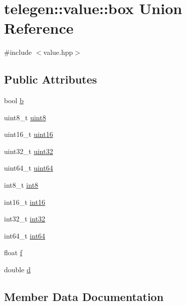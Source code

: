 \hypertarget{uniontelegen_1_1value_1_1box}{}\section{telegen\+:\+:value\+:\+:box Union Reference}
\label{uniontelegen_1_1value_1_1box}


{\ttfamily \#include $<$value.\+hpp$>$}

\subsection*{Public Attributes}
\begin{DoxyCompactItemize}
\item 
bool \hyperlink{uniontelegen_1_1value_1_1box_aca1e8ed6a879c47f23ea0d0d562cff56}{b}
\item 
uint8\+\_\+t \hyperlink{uniontelegen_1_1value_1_1box_af93ba02e91378fcc5dfd7dd44797d9f1}{uint8}
\item 
uint16\+\_\+t \hyperlink{uniontelegen_1_1value_1_1box_ac35300dde1553e491b47b7beb6da05fd}{uint16}
\item 
uint32\+\_\+t \hyperlink{uniontelegen_1_1value_1_1box_a4d9a4908f9344f86f83b562b1dfd5b41}{uint32}
\item 
uint64\+\_\+t \hyperlink{uniontelegen_1_1value_1_1box_af779cb73fc8206ea9e492ca721693519}{uint64}
\item 
int8\+\_\+t \hyperlink{uniontelegen_1_1value_1_1box_ad0228111650848fbc6aa00ab703d4da8}{int8}
\item 
int16\+\_\+t \hyperlink{uniontelegen_1_1value_1_1box_ab5661f0b60552b18a622da1c5795eb8a}{int16}
\item 
int32\+\_\+t \hyperlink{uniontelegen_1_1value_1_1box_ab3d192d88f9510150d8d7588d69cf61c}{int32}
\item 
int64\+\_\+t \hyperlink{uniontelegen_1_1value_1_1box_a669882c6b6ab692eab0006bf61f079cd}{int64}
\item 
float \hyperlink{uniontelegen_1_1value_1_1box_a0a8f0e2d0407419ebf63df5bb8a02f79}{f}
\item 
double \hyperlink{uniontelegen_1_1value_1_1box_a8b25f5894690f65567b83d63e0584b39}{d}
\end{DoxyCompactItemize}


\subsection{Member Data Documentation}
\mbox{\label{uniontelegen_1_1value_1_1box_aca1e8ed6a879c47f23ea0d0d562cff56}} 
